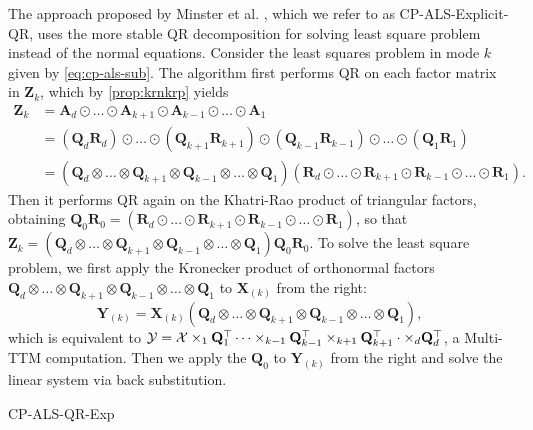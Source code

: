 \documentclass{article}
\newcommand{\mat}[1]{\mathbf{#1}}
\newcommand{\T}[2][]{#1{\mathbf{\cal{#2}}}} 						%
\begin{document}
The approach proposed by Minster et al. \cite{MVLB23}, which we refer to as CP-ALS-Explicit-QR, uses the more stable QR decomposition for solving least square problem instead of the normal equations.
Consider the least squares problem in mode $k$ given by \cref{eq:cp-als-sub}.
The algorithm first performs QR on each factor matrix in $\mat{Z}_k$, which by \cref{prop:krnkrp} yields
\begin{align*}
  \mat{Z}_k &= \mat{A}_d \odot \dots \odot \mat{A}_{k+1} \odot \mat{A}_{k-1} \odot \dots \odot \mat{A}_1 \\
  &= (\mat{Q}_d\mat{R}_d) \odot \dots \odot (\mat{Q}_{k+1}\mat{R}_{k+1}) \odot (\mat{Q}_{k-1}\mat{R}_{k-1}) \odot \dots \odot (\mat{Q}_1\mat{R}_1)  \\
  &= (\mat{Q}_d \otimes \dots \otimes \mat{Q}_{k+1} \otimes \mat{Q}_{k-1} \otimes \dots \otimes \mat{Q}_1)(\mat{R}_d \odot \dots \odot \mat{R}_{k+1} \odot \mat{R}_{k-1} \odot \dots \odot \mat{R}_1).  
\end{align*}
Then it performs QR again on the Khatri-Rao product of triangular factors, obtaining $\mat{Q}_0\mat{R}_0= (\mat{R}_d \odot \dots \odot \mat{R}_{k+1} \odot \mat{R}_{k-1} \odot \dots \odot \mat{R}_1)$, so that $\mat{Z}_k = (\mat{Q}_d \otimes \dots \otimes \mat{Q}_{k+1} \otimes \mat{Q}_{k-1} \otimes \dots \otimes \mat{Q}_1)\mat{Q}_0\mat{R}_0$.
To solve the least square problem, we first apply the Kronecker product of orthonormal factors $\mat{Q}_d \otimes \dots \otimes \mat{Q}_{k+1} \otimes \mat{Q}_{k-1} \otimes \dots \otimes \mat{Q}_1$ to $\mat{X}_{(k)}$ from the right:
$$\mat{Y}_{(k)} = \mat{X}_{(k)}(\mat{Q}_d \otimes \dots \otimes \mat{Q}_{k+1} \otimes \mat{Q}_{k-1} \otimes \dots \otimes \mat{Q}_1),$$
which is equivalent to $\T{Y}=\T{X} \times_1 \mat{Q}_1^{\top} \cdots \times_{k-1} \mat{Q}_{k-1}^{\top}\times_{k+1} \mat{Q}_{k+1}^{\top} \cdot \times_{d} \mat{Q}_{d}^{\top}$, a Multi-TTM computation.
Then we apply the $\mat{Q}_0$ to $\mat{Y}_{(k)}$ from the right and solve the linear system via back substitution.

\begin{algorithm}
  \caption{CP-ALS-QR-Exp}
  \label{alg:cp-als-qr}
  
\end{algorithm}
\end{document}
